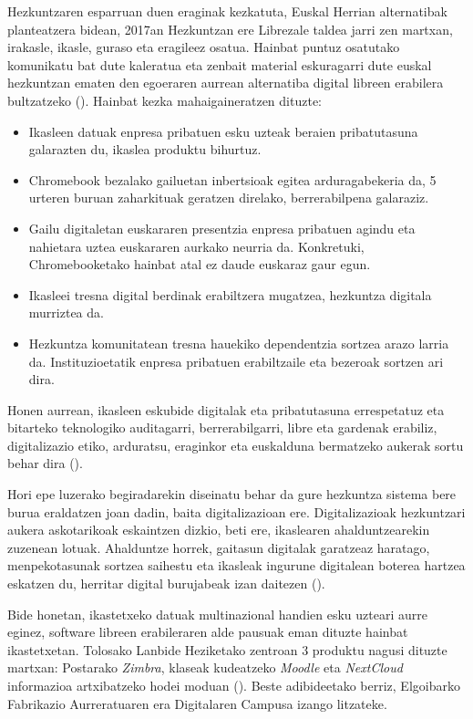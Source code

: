 Hezkuntzaren esparruan duen eraginak kezkatuta, Euskal Herrian alternatibak planteatzera bidean, 2017an Hezkuntzan ere Librezale taldea jarri zen martxan, irakasle, ikasle, guraso eta eragileez osatua. Hainbat puntuz osatutako komunikatu bat dute kaleratua eta zenbait material eskuragarri dute euskal hezkuntzan ematen den egoeraren aurrean alternatiba digital libreen erabilera bultzatzeko (\cite{hl2019komunikatua}). Hainbat kezka mahaigaineratzen dituzte:

\begin{itemize}
    \item Ikasleen datuak enpresa pribatuen esku uzteak beraien pribatutasuna galarazten du, ikaslea produktu bihurtuz. 
    \item Chromebook bezalako gailuetan inbertsioak egitea arduragabekeria da, 5 urteren buruan zaharkituak geratzen direlako, berrerabilpena galaraziz.
    \item Gailu digitaletan euskararen presentzia enpresa pribatuen agindu eta nahietara uztea euskararen aurkako neurria da. Konkretuki, Chromebooketako hainbat atal ez daude euskaraz gaur egun. 
    \item Ikasleei tresna digital berdinak erabiltzera mugatzea, hezkuntza digitala murriztea da.
    \item Hezkuntza komunitatean tresna hauekiko dependentzia sortzea arazo larria da. Instituzioetatik enpresa pribatuen erabiltzaile eta bezeroak sortzen ari dira. 
\end{itemize}

Honen aurrean, ikasleen eskubide digitalak eta pribatutasuna errespetatuz eta bitarteko teknologiko auditagarri, berrerabilgarri, libre eta gardenak erabiliz, digitalizazio etiko, arduratsu, eraginkor eta euskalduna bermatzeko aukerak sortu behar dira (\cite{hl2019komunikatua}). 

Hori epe luzerako begiradarekin diseinatu behar da gure hezkuntza sistema bere burua eraldatzen joan dadin, baita digitalizazioan ere. Digitalizazioak hezkuntzari aukera askotarikoak eskaintzen dizkio, beti ere, ikaslearen ahalduntzearekin zuzenean lotuak. Ahalduntze horrek, gaitasun digitalak garatzeaz haratago, menpekotasunak sortzea saihestu eta ikasleak ingurune digitalean boterea hartzea eskatzen du, herritar digital burujabeak izan daitezen (\cite{hl2019komunikatua}).

Bide honetan, ikastetxeko datuak multinazional handien esku uzteari aurre eginez, software libreen erabileraren alde pausuak eman dituzte hainbat ikastetxetan. Tolosako Lanbide Heziketako zentroan 3 produktu nagusi dituzte martxan: Postarako \textit{Zimbra}, klaseak kudeatzeko \textit{Moodle} eta \textit{NextCloud} informazioa artxibatzeko hodei moduan (\cite{garcia2020}). Beste adibideetako berriz, Elgoibarko Fabrikazio Aurreratuaren era Digitalaren Campusa izango litzateke. 

